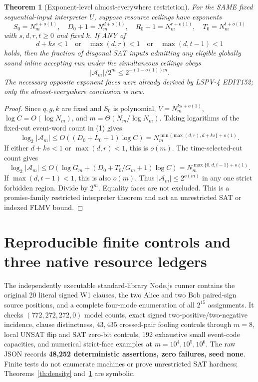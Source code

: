 \documentclass[11pt]{article}
\newtheorem{theorem}{Theorem}
\begin{document}
\begin{theorem}[Exponent-level almost-everywhere restriction]\label{th:exp}
For the SAME fixed sequential-input interpreter $U$, suppose resource ceilings have exponents
\[
 S_0=N_m^{s+o(1)},\quad D_0+1=N_m^{d+o(1)},\quad
 R_0+1=N_m^{r+o(1)},\quad T_0=N_m^{t+o(1)}
\]
with $s,d,r,t\ge0$ and fixed $k$. If ANY of
\[
 \boxed{d+ks<1\quad\mathrm{or}\quad\max(d,r)<1
                   \quad\mathrm{or}\quad\max(d,t-1)<1} \tag{2}
\]
holds, then the fraction of diagonal SAT inputs admitting any eligible globally sound inline accepting run under the simultaneous ceilings obeys
\[
 \boxed{|\mathcal A_m|/2^m\le 2^{-(1-o(1))m}}. \tag{3}
\]
The necessary opposite exponent faces were already derived by LSPV-4 EDIT152; only the almost-everywhere conclusion is new.
\end{theorem}
\begin{proof}
Since $q,g,k$ are fixed and $S_0$ is polynomial, $V=N_m^{ks+o(1)}$, $\log C=O(\log N_m)$, and $m=\Theta(N_m/\log N_m)$. Taking logarithms of the fixed-cut event-word count in (1) gives
\[
 \log_2 |\mathcal A_m|
 \le O((D_0+L_0+1)\log C)
 =N_m^{\min\{\max(d,r),d+ks\}+o(1)}.
\]
If either $d+ks<1$ or $\max(d,r)<1$, this is $o(m)$. The time-selected-cut count gives
\[
 \log_2 |\mathcal A_m|
 \le O(\log G_m+(D_0+T_0/G_m+1)\log C)
 =N_m^{\max\{0,d,t-1\}+o(1)}.
\]
If $\max(d,t-1)<1$, this is also $o(m)$. Thus $|\mathcal A_m|\le 2^{o(m)}$ in any one strict forbidden region. Divide by $2^m$. Equality faces are not excluded. This is a promise-family restricted interpreter theorem and not an unrestricted SAT or indexed FLMV bound.
\end{proof}

\section{Reproducible finite controls and three native resource ledgers}
The independently executable standard-library Node.js runner contains the original 20 literal signed W1 clauses, the two Alice and two Bob paired-sign source positions, and a complete four-mode enumeration of all $2^{15}$ assignments. It checks $(772,272,272,0)$ model counts, exact signed two-positive/two-negative incidence, clause distinctness, $43{,}435$ crossed-pair fooling controls through $m=8$, local UNSAT flip and SAT zero-bit controls, 192 exhaustive small event-code capacities, and numerical strict-face examples at $m=10^4,10^5,10^6$. The raw JSON records \textbf{48,252 deterministic assertions, zero failures, seed none}. Finite tests do not enumerate machines or prove unrestricted SAT hardness; Theorems~\ref{th:density} and~\ref{th:exp} are symbolic.
\end{document}
